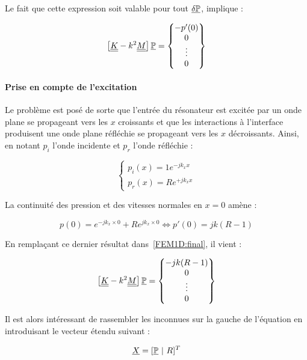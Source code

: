 Le fait que cette expression soit valable pour tout $\underline{\delta\mathbb{P}}$, implique :

\begin{equation}
\left[\underline{\underline{K}} - k^2\underline{\underline{M}}\right]\underline{\mathbb{P}} = \begin{Bmatrix} - p'(0) \\0\\\vdots\\0\end{Bmatrix} \label{FEM1D:final}
\end{equation}

\paragraph{Prise en compte de l'excitation}
Le problème est posé de sorte que l'entrée du résonateur est excitée par un onde plane se propageant vers les $x$
croissants et que les interactions à l'interface produisent une onde plane réfléchie se propageant vers les $x$
décroissants. Ainsi, en notant $p_i$ l'onde incidente et $p_r$ l'onde réfléchie :

\begin{equation*}
	\left\{
	\begin{array}{l}
		p_i(x) = 1e^{-jk_xx}\\
		p_r(x) = Re^{+jk_xx}
	\end{array}
	\right.
\end{equation*}

La continuité des pression et des vitesses normales en $x=0$ amène :

\begin{equation*}
	p(0) = e^{-jk_x\times0}+Re^{jk_x\times0} \Leftrightarrow p'(0) = jk(R-1)
\end{equation*}

En remplaçant ce dernier résultat dans~\eqref{FEM1D:final}, il vient :

\begin{equation}
\left[\underline{\underline{K}} - k^2\underline{\underline{M}}\right]\underline{\mathbb{P}} = \begin{Bmatrix} -jk(R-1)  \\0\\\vdots\\0\end{Bmatrix} \label{FEM1D:final}
\end{equation}

Il est alors intéressant de rassembler les inconnues sur la gauche de l'équation en introduisant le vecteur étendu
suivant :

\begin{equation*}
	\underline{X} = [\underline{\mathbb{P}} ~|~ R]^T
\end{equation*}

